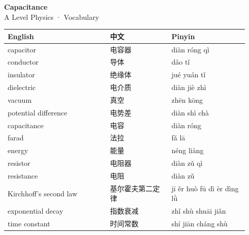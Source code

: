 \documentclass[11pt]{article}
\begin{document}
\begin{center}
  {\LARGE\bfseries Capacitance}\\[0.35em]
  {\large A Level Physics · Vocabulary}
\end{center}
\vspace{0.6em}

\begin{longtable}{@{}p{0.40\linewidth}p{0.24\linewidth}p{0.30\linewidth}@{}}
\toprule
\textbf{English} & \textbf{中文} & \textbf{Pinyin} \\
\midrule
\endhead
\bottomrule
\endlastfoot
capacitor & 电容器 & diàn róng qì \\
conductor & 导体 & dǎo tǐ \\
insulator & 绝缘体 & jué yuán tǐ \\
dielectric & 电介质 & diàn jiè zhì \\
vacuum & 真空 & zhēn kōng \\
potential difference & 电势差 & diàn shì chà \\
capacitance & 电容 & diàn róng \\
farad & 法拉 & fǎ lā \\
energy & 能量 & néng liàng \\
resistor & 电阻器 & diàn zǔ qì \\
resistance & 电阻 & diàn zǔ \\
Kirchhoff's second law & 基尔霍夫第二定律 & jī ěr huò fū dì èr dìng lǜ \\
exponential decay & 指数衰减 & zhǐ shù shuāi jiǎn \\
time constant & 时间常数 & shí jiān cháng shù \\
\end{longtable}
\end{document}
